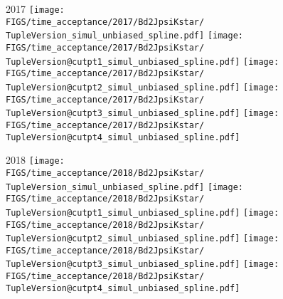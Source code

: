 \begin{frame}
  2017
  \texttt{[image: \\FIGS/time\_acceptance/2017/Bd2JpsiKstar/\\TupleVersion\_simul\_unbiased\_spline.pdf]}
  \texttt{[image: \\FIGS/time\_acceptance/2017/Bd2JpsiKstar/\\TupleVersion@cutpt1\_simul\_unbiased\_spline.pdf]}
  \texttt{[image: \\FIGS/time\_acceptance/2017/Bd2JpsiKstar/\\TupleVersion@cutpt2\_simul\_unbiased\_spline.pdf]}
  \texttt{[image: \\FIGS/time\_acceptance/2017/Bd2JpsiKstar/\\TupleVersion@cutpt3\_simul\_unbiased\_spline.pdf]}
  \texttt{[image: \\FIGS/time\_acceptance/2017/Bd2JpsiKstar/\\TupleVersion@cutpt4\_simul\_unbiased\_spline.pdf]}
  \vspace*{2mm}

  2018
  \texttt{[image: \\FIGS/time\_acceptance/2018/Bd2JpsiKstar/\\TupleVersion\_simul\_unbiased\_spline.pdf]}
  \texttt{[image: \\FIGS/time\_acceptance/2018/Bd2JpsiKstar/\\TupleVersion@cutpt1\_simul\_unbiased\_spline.pdf]}
  \texttt{[image: \\FIGS/time\_acceptance/2018/Bd2JpsiKstar/\\TupleVersion@cutpt2\_simul\_unbiased\_spline.pdf]}
  \texttt{[image: \\FIGS/time\_acceptance/2018/Bd2JpsiKstar/\\TupleVersion@cutpt3\_simul\_unbiased\_spline.pdf]}
  \texttt{[image: \\FIGS/time\_acceptance/2018/Bd2JpsiKstar/\\TupleVersion@cutpt4\_simul\_unbiased\_spline.pdf]}

\end{frame} %



